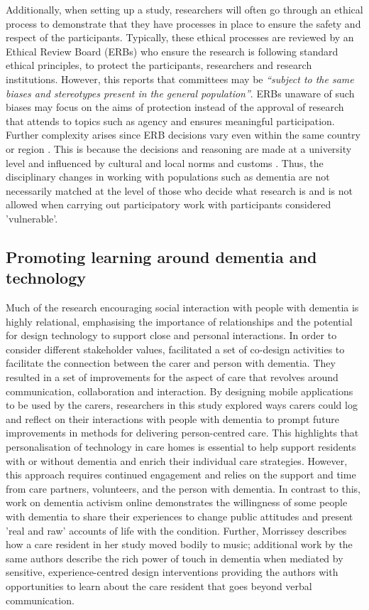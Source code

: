 Additionally, when setting up a study, researchers will often go through an ethical process to demonstrate that they have processes in place to ensure the safety and respect of the participants. Typically, these ethical processes are reviewed by an Ethical Review Board (ERBs) who ensure the research is following standard ethical principles, to protect the participants, researchers and research institutions. However, this \cite{pachana_can_2014} reports that committees may be \textit{``subject to the same biases and stereotypes present in the general population''}. ERBs unaware of such biases may focus on the aims of protection instead of the approval of research that attends to topics such as agency and ensures meaningful participation. Further complexity arises since ERB decisions vary even within the same country or region \citep{edwards_research_2004}. This is because the decisions and reasoning are made at a university level and influenced by cultural and local norms and customs \citep{flicker_ethical_2007}. Thus, the disciplinary changes in working with populations such as dementia are not necessarily matched at the level of those who decide what research is and is not allowed when carrying out participatory work with participants considered 'vulnerable'.

\subsection{Promoting learning around dementia and technology}
\label{BL:gap:Learning}
Much of the research encouraging social interaction with people with dementia is highly relational, emphasising the importance of relationships and the potential for design technology to support close and personal interactions. In order to consider different stakeholder values, \cite{maiden_computing_2013} facilitated a set of co-design activities to facilitate the connection between the carer and person with dementia. They resulted in a set of improvements for the aspect of care that revolves around communication, collaboration and interaction. By designing mobile applications to be used by the carers, researchers in this study explored ways carers could log and reflect on their interactions with people with dementia to prompt future improvements in methods for delivering person-centred care. This highlights that personalisation of technology in care homes is essential to help support residents with or without dementia and enrich their individual care strategies. However, this approach requires continued engagement and relies on the support and time from care partners, volunteers, and the person with dementia. In contrast to this, \cite{lazar_safe_2019} work on dementia activism online demonstrates the willingness of some people with dementia to share their experiences to change public attitudes and present 'real and raw' accounts of life with the condition. Further, Morrissey describes how a care resident in her study moved bodily to music; additional work by the same authors describe the rich power of touch in dementia when mediated by sensitive, experience-centred design interventions providing  the authors with opportunities to learn about the care resident that goes beyond verbal communication. 

